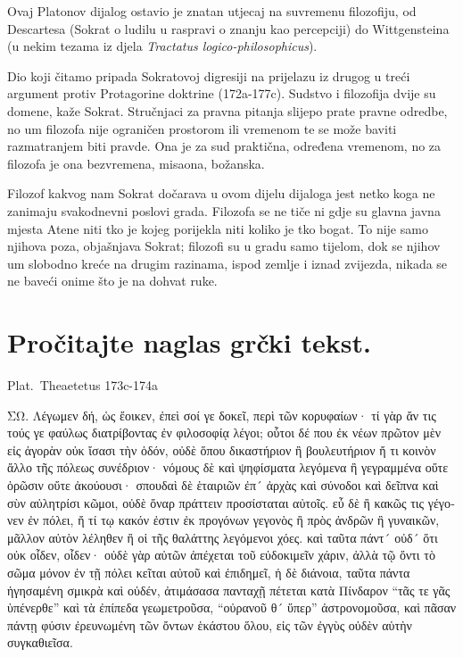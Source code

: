 Ovaj Platonov dijalog ostavio je znatan utjecaj na suvremenu filozofiju, od Descartesa (Sokrat o ludilu u raspravi o znanju kao percepciji) do Wittgensteina (u nekim tezama iz djela \textit{Tractatus logico-philosophicus}).

Dio koji čitamo pripada Sokratovoj digresiji na prijelazu iz drugog u treći argument protiv Protagorine doktrine (172a-177c). Sudstvo i filozofija dvije su domene, kaže Sokrat. Stručnjaci za pravna pitanja slijepo prate pravne odredbe, no um filozofa nije ograničen prostorom ili vremenom te se može baviti razmatranjem biti pravde. Ona je za sud praktična, određena vremenom, no za filozofa je ona bezvremena, misaona, božanska. 

Filozof kakvog nam Sokrat dočarava u ovom dijelu dijaloga jest netko koga ne zanimaju svakodnevni poslovi grada. Filozofa se ne tiče ni gdje su glavna javna mjesta Atene niti tko je kojeg porijekla niti koliko je tko bogat. To nije samo njihova poza, objašnjava Sokrat; filozofi su u gradu samo tijelom, dok se njihov um slobodno kreće na drugim razinama, ispod zemlje i iznad zvijezda, nikada se ne baveći onime što je na dohvat ruke.


\newpage

\section*{Pročitajte naglas grčki tekst.}

Plat.\ Theaetetus 173c-174a


\medskip


{\large

\begin{greek}

\noindent ΣΩ. Λέγωμεν δή, ὡς ἔοικεν, ἐπεὶ σοί γε δοκεῖ, περὶ τῶν κορυφαίων· τί γὰρ ἄν τις τούς γε φαύλως διατρίβοντας ἐν φιλοσοφίᾳ λέγοι; οὗτοι δέ που ἐκ νέων πρῶτον μὲν εἰς ἀγορὰν οὐκ ἴσασι τὴν ὁδόν, οὐδὲ ὅπου δικαστήριον ἢ βουλευτήριον ἤ τι κοινὸν ἄλλο τῆς πόλεως συνέδριον· νόμους δὲ καὶ ψηφίσματα λεγόμενα ἢ γεγραμμένα οὔτε ὁρῶσιν οὔτε ἀκούουσι· σπουδαὶ δὲ ἑταιριῶν ἐπ´ ἀρχὰς καὶ σύνοδοι καὶ δεῖπνα καὶ σὺν αὐλητρίσι κῶμοι, οὐδὲ ὄναρ πράττειν προσίσταται αὐτοῖς. εὖ δὲ ἢ κακῶς τις γέγονεν ἐν πόλει, ἤ τί τῳ κακόν ἐστιν ἐκ προγόνων γεγονὸς ἢ πρὸς ἀνδρῶν ἢ γυναικῶν, μᾶλλον αὐτὸν λέληθεν ἢ οἱ τῆς θαλάττης λεγόμενοι χόες. καὶ ταῦτα πάντ´ οὐδ´ ὅτι οὐκ οἶδεν, οἶδεν· οὐδὲ γὰρ αὐτῶν ἀπέχεται τοῦ εὐδοκιμεῖν χάριν, ἀλλὰ τῷ ὄντι τὸ σῶμα μόνον ἐν τῇ πόλει κεῖται αὐτοῦ καὶ ἐπιδημεῖ, ἡ δὲ διάνοια, ταῦτα πάντα ἡγησαμένη σμικρὰ καὶ οὐδέν, ἀτιμάσασα πανταχῇ πέτεται κατὰ Πίνδαρον ``τᾶς τε γᾶς ὑπένερθε'' καὶ τὰ ἐπίπεδα γεωμετροῦσα, ``οὐρανοῦ θ´ ὕπερ'' ἀστρονομοῦσα, καὶ πᾶσαν πάντῃ φύσιν ἐρευνωμένη τῶν ὄντων ἑκάστου ὅλου, εἰς τῶν ἐγγὺς οὐδὲν αὑτὴν συγκαθιεῖσα.

\end{greek}

}



